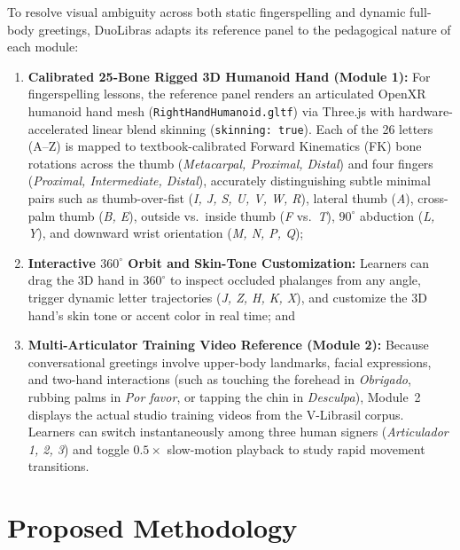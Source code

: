 \documentclass[12pt,a4paper]{article}
\begin{document}
To resolve visual ambiguity across both static fingerspelling and dynamic full-body greetings, DuoLibras adapts its reference panel to the pedagogical nature of each module:

\begin{enumerate}
    \item \textbf{Calibrated 25-Bone Rigged 3D Humanoid Hand (Module 1):} For fingerspelling lessons, the reference panel renders an articulated OpenXR humanoid hand mesh (\texttt{RightHandHumanoid.gltf}) via Three.js with hardware-accelerated linear blend skinning (\texttt{skinning: true}). Each of the 26 letters (A--Z) is mapped to textbook-calibrated Forward Kinematics (FK) bone rotations across the thumb (\textit{Metacarpal, Proximal, Distal}) and four fingers (\textit{Proximal, Intermediate, Distal}), accurately distinguishing subtle minimal pairs such as thumb-over-fist (\textit{I, J, S, U, V, W, R}), lateral thumb (\textit{A}), cross-palm thumb (\textit{B, E}), outside vs.\ inside thumb (\textit{F} vs.\ \textit{T}), $90^\circ$ abduction (\textit{L, Y}), and downward wrist orientation (\textit{M, N, P, Q});

    \item \textbf{Interactive $360^\circ$ Orbit and Skin-Tone Customization:} Learners can drag the 3D hand in $360^\circ$ to inspect occluded phalanges from any angle, trigger dynamic letter trajectories (\textit{J, Z, H, K, X}), and customize the 3D hand's skin tone or accent color in real time; and

    \item \textbf{Multi-Articulator Training Video Reference (Module 2):} Because conversational greetings involve upper-body landmarks, facial expressions, and two-hand interactions (such as touching the forehead in \textit{Obrigado}, rubbing palms in \textit{Por favor}, or tapping the chin in \textit{Desculpa}), Module~2 displays the actual studio training videos from the V-Librasil corpus. Learners can switch instantaneously among three human signers (\textit{Articulador 1, 2, 3}) and toggle $0.5\times$ slow-motion playback to study rapid movement transitions.
\end{enumerate}


\section{Proposed Methodology}
\label{sec:methodology}
\end{document}
